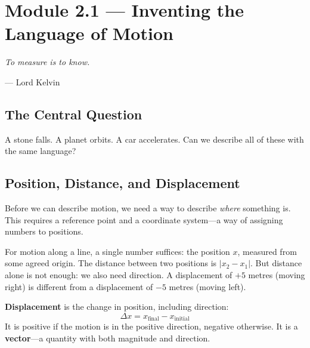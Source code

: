 \documentclass[12pt, a4paper, twoside]{book}
\theoremstyle{disc}
\begin{document}
\setcounter{chapter}{1}
\setcounter{section}{0}

\section{Module 2.1 — Inventing the Language of Motion}
\label{sec:language_motion}

\epigraph{
  \itshape To measure is to know.
}{--- Lord Kelvin}

\subsection{The Central Question}

\begin{tcolorbox}[colback=deep!5, colframe=deep, fontupper=\large\bfseries\color{deep}]
A stone falls. A planet orbits. A car accelerates. Can we describe all of these with the same language?
\end{tcolorbox}

\subsection{Position, Distance, and Displacement}

Before we can describe motion, we need a way to describe \textit{where} something is. This requires a reference point and a coordinate system---a way of assigning numbers to positions.

For motion along a line, a single number suffices: the position $x$, measured from some agreed origin. The distance between two positions is $|x_2 - x_1|$. But distance alone is not enough: we also need direction. A displacement of $+5$ metres (moving right) is different from a displacement of $-5$ metres (moving left).

\begin{namebox}
\textbf{Displacement} is the change in position, including direction:
\begin{equation}
  \Delta x = x_{\text{final}} - x_{\text{initial}}
\end{equation}
It is positive if the motion is in the positive direction, negative otherwise. It is a \textbf{vector}---a quantity with both magnitude and direction.
\end{namebox}
\end{document}
